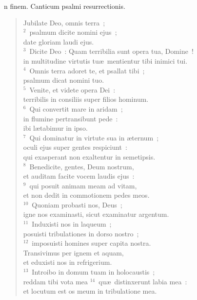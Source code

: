 \bchapter
{}n finem. Canticum psalmi resurrectionis. \begin{flushleft}\begin{verse}\vspace{6pt}Jubilate Deo, omnis terra~;\\
${}^{2}$~psalmum dicite nomini ejus~;\\ date gloriam laudi ejus.\\
${}^{3}$~Dicite Deo~: Quam terribilia sunt opera tua, Domine~!\\ in multitudine virtutis tu\ae\ mentientur tibi inimici tui.\\
${}^{4}$~Omnis terra adoret te, et psallat tibi~;\\ psalmum dicat nomini tuo.\\
${}^{5}$~Venite, et videte opera Dei~:\\ terribilis in consiliis super filios hominum.\\
${}^{6}$~Qui convertit mare in aridam~;\\ in flumine pertransibunt pede~:\\ ibi l\ae tabimur in ipso.\\
${}^{7}$~Qui dominatur in virtute sua in \ae ternum~;\\ oculi ejus super gentes respiciunt~:\\ qui exasperant non exaltentur in semetipsis.\\
${}^{8}$~Benedicite, gentes, Deum nostrum,\\ et auditam facite vocem laudis ejus~:\\
${}^{9}$~qui posuit animam meam ad vitam,\\ et non dedit in commotionem pedes meos.\\
${}^{10}$~Quoniam probasti nos, Deus~;\\ igne nos examinasti, sicut examinatur argentum.\\
${}^{11}$~Induxisti nos in laqueum~;\\ posuisti tribulationes in dorso nostro~;\\
${}^{12}$~imposuisti homines super capita nostra.\\ Transivimus per ignem et aquam,\\ et eduxisti nos in refrigerium.\\
${}^{13}$~Introibo in domum tuam in holocaustis~;\\ reddam tibi vota mea
${}^{14}$~qu\ae\ distinxerunt labia mea~:\\ et locutum est os meum in tribulatione mea.\\

\end{verse}
\end{flushleft}
